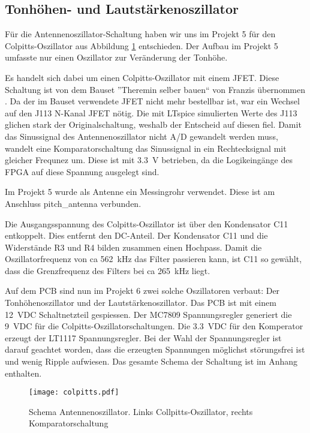 \subsection{Tonhöhen- und Lautstärkenoszillator}\label{subsec:Antennenoszilator}
Für die Antennenoszillator-Schaltung haben wir uns im Projekt 5 für den Colpitts-Oszillator aus Abbildung \ref{img:colpitts} entschieden. Der Aufbau im Projekt 5 umfasste nur einen Oszillator zur Veränderung der Tonhöhe.

Es handelt sich dabei um einen Colpitts-Oszillator mit einem JFET. Diese Schaltung ist von dem Bauset ''Theremin selber bauen`` von Franzis übernommen \cite{Franzis}. 
Da der im Bauset verwendete JFET nicht mehr bestellbar ist, war ein Wechsel auf den J113 N-Kanal JFET nötig. Die mit LTspice simulierten Werte des J113 glichen stark der Originalschaltung, weshalb der Entscheid auf diesen fiel. 
Damit das Sinussignal des Antennenoszillator nicht A/D gewandelt werden muss, wandelt eine Komparatorschaltung das Sinussignal in ein Rechtecksignal mit gleicher Frequnez um. 
Diese ist mit \SI{3.3}{V} betrieben, da die Logikeingänge des FPGA auf diese Spannung ausgelegt sind. 

Im Projekt 5 wurde als Antenne ein Messingrohr verwendet. Diese ist am Anschluss pitch\_antenna verbunden. 

Die Ausgangsspannung des Colpitts-Oszillator ist über den Kondensator C11 entkoppelt. Dies entfernt den DC-Anteil. Der Kondensator C11 und die Widerstände R3 und R4 bilden zusammen einen Hochpass. Damit die Oszillatorfrequenz von ca \SI{562}{kHz} das Filter passieren kann, ist C11 so gewählt, dass die Grenzfrequenz des Filters bei ca \SI{265}{kHz} liegt. 

Auf dem PCB sind nun im Projekt 6 zwei solche Oszillatoren verbaut: Der Tonhöhenoszillator und der Lautstärkenoszillator. Das PCB ist mit einem \SI{12} {VDC} Schaltnetzteil gespiessen. Der MC7809 Spannungsregler generiert die \SI{9} {VDC} für die Colpitts-Oszillatorschaltungen. Die \SI{3.3} {VDC} für den Komperator erzeugt der LT1117 Spannungsregler. Bei der Wahl der Spannungsregler ist darauf geachtet worden, dass die erzeugten Spannungen möglichst störungsfrei ist und wenig Ripple aufwiesen. Das gesamte Schema der Schaltung ist im Anhang enthalten.

\begin{figure}[h]
	\centering
	\texttt{[image: colpitts.pdf]}
	\caption{Schema Antennenoszillator. Links Collpitts-Oszillator, rechts Komparatorschaltung}
	\label{img:colpitts}
\end{figure} 

\clearpage


